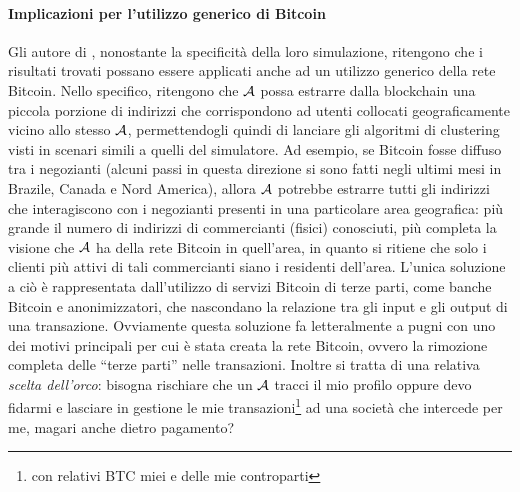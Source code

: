 \paragraph{Implicazioni per l'utilizzo generico di Bitcoin}

Gli autore di \cite{user-privacy}, nonostante la specificità della loro simulazione, ritengono che i risultati trovati possano essere applicati anche ad un utilizzo generico della rete Bitcoin.
Nello specifico, ritengono che $\mathcal{A}$ possa estrarre dalla blockchain una piccola porzione di indirizzi che corrispondono ad utenti collocati geograficamente vicino allo stesso $\mathcal{A}$, permettendogli quindi di lanciare gli algoritmi di clustering visti in scenari simili a quelli del simulatore.
Ad esempio, se Bitcoin fosse diffuso tra i negozianti (alcuni passi in questa direzione si sono fatti negli ultimi mesi in Brazile, Canada e Nord America), allora $\mathcal{A}$ potrebbe estrarre tutti gli indirizzi che interagiscono con i negozianti presenti in una particolare area geografica: più grande il numero di indirizzi di commercianti (fisici) conosciuti, più completa la visione che $\mathcal{A}$ ha della rete Bitcoin in quell'area, in quanto si ritiene che solo i clienti più attivi di tali commercianti siano i residenti dell'area.
L'unica soluzione a ciò è rappresentata dall'utilizzo di servizi Bitcoin di terze parti, come banche Bitcoin e anonimizzatori, che nascondano la relazione tra gli input e gli output di una transazione. Ovviamente questa soluzione fa letteralmente a pugni con uno dei motivi principali per cui è stata creata la rete Bitcoin, ovvero la rimozione completa delle ``terze parti'' nelle transazioni. Inoltre si tratta di una relativa \emph{scelta dell'orco}: bisogna rischiare che un $\mathcal{A}$ tracci il mio profilo oppure devo fidarmi e lasciare in gestione le mie transazioni\footnote{con relativi BTC miei e delle mie controparti} ad una società che intercede per me, magari anche dietro pagamento?


